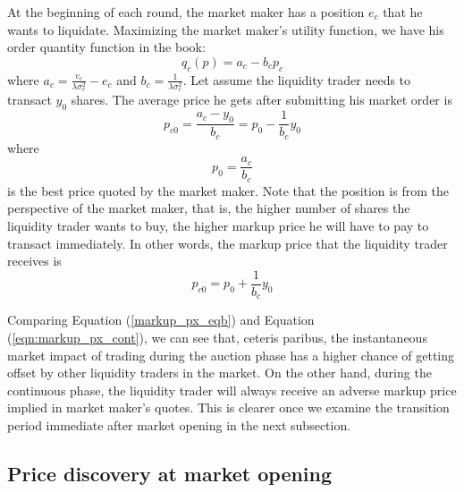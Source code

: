 At the beginning of each round, the market maker has a position $e_c$ that he wants to liquidate. Maximizing the market maker's utility function, we have his order quantity function in the book:
\begin{equation}\label{eqn:mm_eval_cont}
  q_c(p) = a_c - b_c p_c
\end{equation}
where $a_c = \frac{v_c}{\lambda \sigma_c^2} - e_c$ and $b_c=\frac{1}{\lambda \sigma_c^2}$. Let assume the liquidity trader needs to transact $y_0$ shares. The average price he gets after submitting his market order is
\[
  p_{c0} = \frac{a_c-y_0}{b_c} = p_0 - \frac{1}{b_c} y_0
\]
where
\[
  p_0 = \frac{a_c}{b_c}
\]
is the best price quoted by the market maker. Note that the position is from the perspective of the market maker, that is, the higher number of shares the liquidity trader wants to buy, the higher markup price he will have to pay to transact immediately. In other words, the markup price that the liquidity trader receives is
\begin{equation}\label{eqn:markup_px_cont}
  p_{c0} = p_0 + \frac{1}{b_c} y_0
\end{equation}

Comparing Equation (\ref{markup_px_eqb}) and Equation (\ref{eqn:markup_px_cont}), we can see that, ceteris paribus, the instantaneous market impact of trading during the auction phase has a higher chance of getting offset by other liquidity traders in the market. On the other hand, during the continuous phase, the liquidity trader will always receive an adverse markup price implied in market maker's quotes. This is clearer once we examine the transition period immediate after market opening in the next subsection.

\subsection{Price discovery at market opening}\label{subsec:AnalyticalFrameworkTransitionPeriod}

